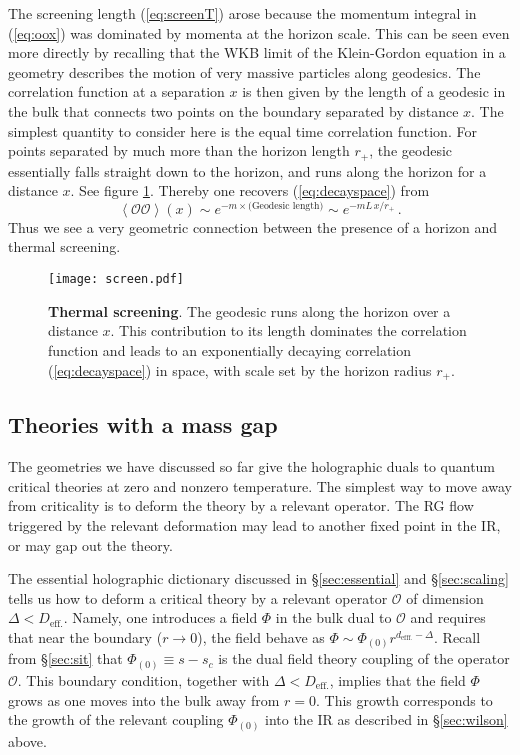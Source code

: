 \documentclass[10pt, oneside]{book}
\def\be{\begin{equation}}
\def\ee{\end{equation}}
\def\ocal{{\mathcal{O}}}
\begin{document}
\begin{doublespace}
The screening length (\ref{eq:screenT}) arose because the momentum integral in (\ref{eq:oox}) was dominated by momenta at the horizon scale. This can be seen even more directly by recalling that the WKB limit of the Klein-Gordon equation in a geometry describes the motion of very massive particles along geodesics. The correlation function at a separation $x$ is then given by the length of a geodesic in the bulk that connects two points on the boundary separated by distance $x$. The simplest quantity to consider here is the equal time correlation function. For points separated by much more than the horizon length $r_+$, the geodesic essentially falls straight down to the horizon, and runs along the horizon for a distance $x$. See figure \ref{fig:screen}. Thereby one recovers (\ref{eq:decayspace}) from
\be\label{eq:geod}
\left\langle \ocal \ocal \right\rangle(x) \sim e^{- m \times \text{(Geodesic length)}} \sim e^{- m L \, x/r_+} \,.
\ee
Thus we see a very geometric connection between the presence of a horizon and thermal screening.
\begin{figure}[h]
\centering
\texttt{[image: screen.pdf]}
\caption{\label{fig:screen} {\bf Thermal screening}. The geodesic runs along the horizon over a distance $x$. This contribution to its length dominates the correlation function and leads to an exponentially decaying correlation (\ref{eq:decayspace}) in space, with scale set by the horizon radius $r_+$.}
\end{figure}

\subsection{Theories with a mass gap}

The geometries we have discussed so far give the holographic duals to quantum critical theories at zero and nonzero temperature. The simplest way to move away from criticality is to deform the theory by a relevant operator. The RG flow triggered by the relevant deformation may lead to another fixed point in the IR, or may gap out the theory.

The essential holographic dictionary discussed in \S\ref{sec:essential} and \S\ref{sec:scaling} tells us how to deform a critical theory by a relevant operator $\ocal$ of dimension $\Delta < D_\text{eff.}$. Namely, one introduces a field $\Phi$ in the bulk dual to $\ocal$ and requires that near the boundary ($r \to 0$), the field behave as $\Phi \sim \Phi_{(0)} r^{d_\text{efff.}-\Delta}$. Recall from \S\ref{sec:sit} that $\Phi_{(0)} \equiv s-s_c$ is the dual field theory coupling of the operator $\ocal$. This boundary condition, together with $\Delta < D_\text{eff.}$, implies that the field $\Phi$ grows as one moves into the bulk away from $r=0$. This growth corresponds to the growth of the relevant coupling $\Phi_{(0)}$ into the IR as described in \S\ref{sec:wilson} above.


\end{doublespace}
\end{document}
